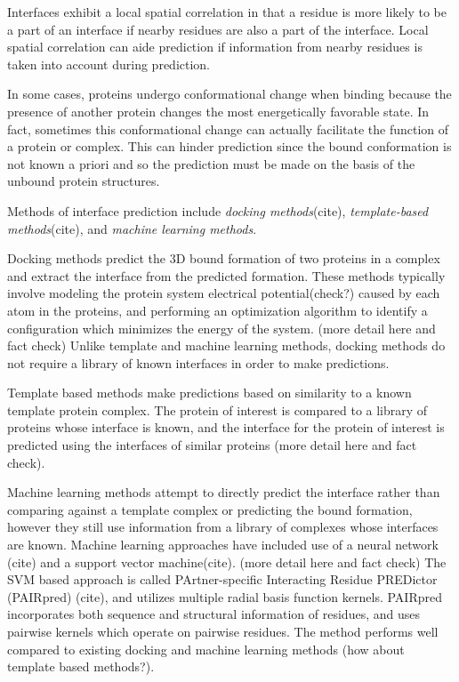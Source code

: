 Interfaces exhibit a local spatial correlation in that a residue is more likely to be a part of an interface if nearby residues are also a part of the interface. 
Local spatial correlation can aide prediction if information from nearby residues is taken into account during prediction.

In some cases, proteins undergo conformational change when binding because the presence of another protein changes the most energetically favorable state. 
In fact, sometimes this conformational change can actually facilitate the function of a protein or complex.
This can hinder prediction since the bound conformation is not known a priori and so the prediction must be made on the basis of the unbound protein structures. 

Methods of interface prediction include \textit{docking methods}(cite), \textit{template-based methods}(cite), and \textit{machine learning methods}.

Docking methods predict the 3D bound formation of two proteins in a complex and extract the interface from the predicted formation. 
These methods typically involve modeling the protein system electrical potential(check?) caused by each atom in the proteins, and performing an optimization algorithm to identify a configuration which minimizes the energy of the system. (more detail here and fact check)
Unlike template and machine learning methods, docking methods do not require a library of known interfaces in order to make predictions.

Template based methods make predictions based on similarity to a known template protein complex. 
The protein of interest is compared to a library of proteins whose interface is known, and the interface for the protein of interest is predicted using the interfaces of similar proteins (more detail here and fact check).

Machine learning methods attempt to directly predict the interface rather than comparing against a template complex or predicting the bound formation, however they still use information from a library of complexes whose interfaces are known.
Machine learning approaches have included use of a neural network (cite) and a support vector machine(cite). (more detail here and fact check)
The SVM based approach is called PArtner-specific Interacting Residue PREDictor (PAIRpred) (cite), and utilizes multiple radial basis function kernels. 
PAIRpred incorporates both sequence and structural information of residues, and uses pairwise kernels which operate on pairwise residues.
The method performs well compared to existing docking and machine learning methods (how about template based methods?).

